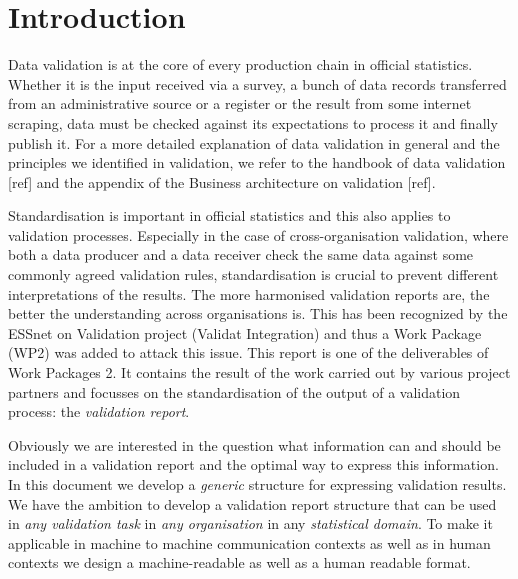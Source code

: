 \section{Introduction}
\label{sect:introduction}

Data validation is at the core of every production chain in official statistics.
Whether it is the input received via a survey, a bunch of data records transferred from an administrative source or a register or the result from some internet scraping,
data must be checked against its expectations to process it and finally publish it.
For a more detailed explanation of data validation in general and the principles we identified in validation, we refer to the 
handbook of data validation [ref] and the appendix of the Business architecture on validation [ref].

Standardisation is important in official statistics and this also applies to validation processes.
Especially in the case of cross-organisation validation, where both a data producer and a data receiver check the same data against some
commonly agreed validation rules, standardisation is crucial to prevent different interpretations of the results.
The more harmonised validation reports are, the better the understanding across organisations is.
This has been recognized by the ESSnet on Validation project (Validat Integration) and thus a Work Package (WP2) was added to attack this issue.
This report is one of the deliverables of Work Packages 2.
It contains the result of the work carried out by various project partners and focusses on the standardisation of the output of a validation process: the \emph{validation report}.

Obviously we are interested in the question what information can and should be included in a validation report and the optimal way to express this information.
In this document we develop a \emph{generic} structure for expressing validation results.
We have the ambition to develop a validation report structure that can be used in \emph{any validation task} in \emph{any organisation} in any \emph{statistical domain}. 
To make it applicable in machine to machine communication contexts as well as in human contexts we design a machine-readable as well as a human readable format.

